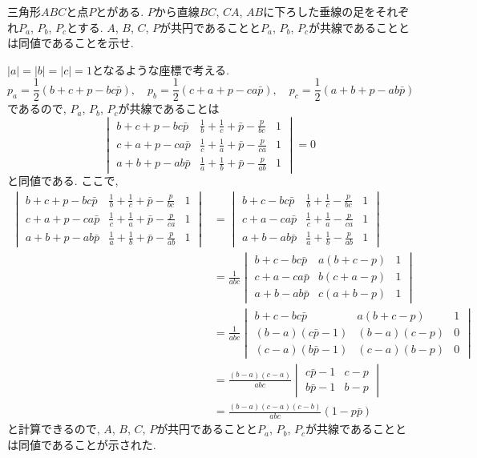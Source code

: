 \begin{bprb}[Simsonの定理]
三角形$ABC$と点$P$とがある.
$P$から直線$BC$, $CA$, $AB$に下ろした垂線の足をそれぞれ$P_a$, $P_b$, $P_c$とする.
$A$, $B$, $C$, $P$が共円であることと$P_a$, $P_b$, $P_c$が共線であることとは同値であることを示せ.
\end{bprb}
\begin{ifsol*}
$\lvert a\rvert=\lvert b\rvert=\lvert c\rvert=1$となるような座標で考える.
\[p_a=\frac 12(b+c+p-bc\bar p),\quad p_b=\frac 12(c+a+p-ca\bar p),\quad p_c=\frac 12(a+b+p-ab\bar p)\]
であるので, $P_a$, $P_b$, $P_c$が共線であることは
\[\begin{vmatrix}
b+c+p-bc\bar p&\frac 1b+\frac 1c+\bar p-\frac p{bc}&1\\
c+a+p-ca\bar p&\frac 1c+\frac 1a+\bar p-\frac p{ca}&1\\
a+b+p-ab\bar p&\frac 1a+\frac 1b+\bar p-\frac p{ab}&1
\end{vmatrix}=0\]
と同値である.
ここで,
\begin{align*}
\begin{vmatrix}
b+c+p-bc\bar p&\frac 1b+\frac 1c+\bar p-\frac p{bc}&1\\
c+a+p-ca\bar p&\frac 1c+\frac 1a+\bar p-\frac p{ca}&1\\
a+b+p-ab\bar p&\frac 1a+\frac 1b+\bar p-\frac p{ab}&1
\end{vmatrix}
&=\begin{vmatrix}
b+c-bc\bar p&\frac 1b+\frac 1c-\frac p{bc}&1\\
c+a-ca\bar p&\frac 1c+\frac 1a-\frac p{ca}&1\\
a+b-ab\bar p&\frac 1a+\frac 1b-\frac p{ab}&1
\end{vmatrix}\\
&=\frac 1{abc}\begin{vmatrix}
b+c-bc\bar p&a(b+c-p)&1\\
c+a-ca\bar p&b(c+a-p)&1\\
a+b-ab\bar p&c(a+b-p)&1
\end{vmatrix}\\
&=\frac 1{abc}\begin{vmatrix}
b+c-bc\bar p&a(b+c-p)&1\\
(b-a)(c\bar p-1)&(b-a)(c-p)&0\\
(c-a)(b\bar p-1)&(c-a)(b-p)&0
\end{vmatrix}\\
&=\frac{(b-a)(c-a)}{abc}\begin{vmatrix}
c\bar p-1&c-p\\
b\bar p-1&b-p
\end{vmatrix}\\
&=\frac{(b-a)(c-a)(c-b)}{abc}(1-p\bar p)
\end{align*}
と計算できるので, $A$, $B$, $C$, $P$が共円であることと$P_a$, $P_b$, $P_c$が共線であることとは同値であることが示された.
\end{ifsol*}